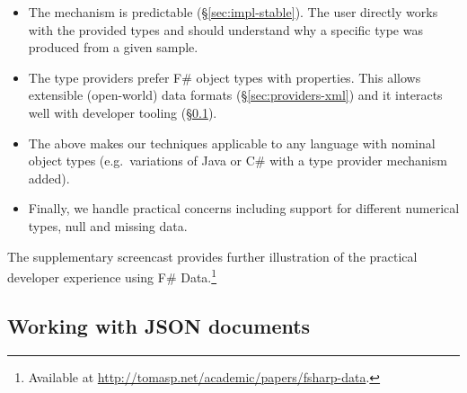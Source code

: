 \documentclass[10pt]{sigplanconf}
\newcommand{\kvd}[1]{\textnormal{\textcolor{kvdclr}{\sffamily #1}}}
\begin{document}
\begin{itemize}
\item The mechanism is predictable (\S\ref{sec:impl-stable}). The user directly works with the
  provided types and should understand why a specific type was produced from a given sample.

\item The type providers prefer F\# object types with properties. This allows extensible
  (open-world) data formats (\S\ref{sec:providers-xml}) and it interacts well with developer tooling
  (\S\ref{sec:providers-json}).

\item The above makes our techniques applicable to any language with nominal
  object types (e.g.~variations of Java or C\# with a type provider mechanism added).

\item Finally, we handle practical concerns including
  support for different numerical types, \kvd{null} and missing data.
\end{itemize}

\noindent
The supplementary screencast provides further illustration of the practical developer
experience using F\# Data.\footnote{Available at \url{http://tomasp.net/academic/papers/fsharp-data}.}


\subsection{Working with JSON documents}
\label{sec:providers-json}
\end{document}

